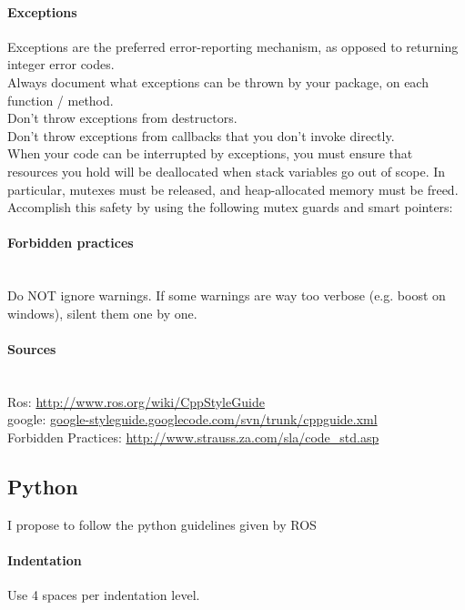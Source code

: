 \paragraph{Exceptions}

Exceptions are the preferred error-reporting mechanism, as opposed to returning integer error codes.\\
Always document what exceptions can be thrown by your package, on each function / method.\\
Don't throw exceptions from destructors.\\
Don't throw exceptions from callbacks that you don't invoke directly.\\


When your code can be interrupted by exceptions, you must ensure that resources you hold will be deallocated when stack variables go out of scope. In particular, mutexes must be released, and heap-allocated memory must be freed. Accomplish this safety by using the following mutex guards and smart pointers:

\paragraph{Forbidden practices}~\\
Do NOT ignore warnings. If some warnings are way too verbose (e.g. boost on windows), silent them one by one.



\paragraph{Sources}~\\
Ros: \url{http://www.ros.org/wiki/CppStyleGuide}\\
google: \url{google-styleguide.googlecode.com/svn/trunk/cppguide.xml}\\
Forbidden Practices: \url{http://www.strauss.za.com/sla/code_std.asp}\\




\subsection{Python}
I propose to follow the python guidelines given by ROS \url{}

\paragraph{Indentation} Use 4 spaces per indentation level.

